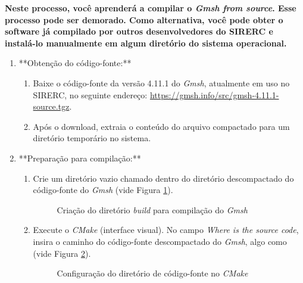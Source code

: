 \documentclass[a4paper,11pt]{article}
\newcommand{\sistema}{\textsf{SIRERC}}
\newcommand{\cmake}{\textit{CMake}}
\newcommand{\build}{\textit{build}}
\newcommand{\gmsh}{\textit{Gmsh}}
\newcommand{\cautionbox}[1]{
	\vskip 5mm
	\begin{leftbar}
		\textbf{#1}
	\end{leftbar}
	\vskip 5mm
}
\begin{document}
\cautionbox{
	Neste processo, você aprenderá a compilar o \gmsh{} \emph{from source}. Esse processo pode ser demorado. Como alternativa, você pode obter o software já compilado por outros desenvolvedores do \sistema{} e instalá-lo manualmente em algum diretório do sistema operacional.
}

\begin{enumerate}
	\item **Obtenção do código-fonte:**
	\begin{enumerate}
		\item Baixe o código-fonte da versão 4.11.1 do \gmsh{}, atualmente em uso no \sistema{}, no seguinte endereço: \url{https://gmsh.info/src/gmsh-4.11.1-source.tgz}.
		\item Após o download, extraia o conteúdo do arquivo compactado para um diretório temporário no sistema.
	\end{enumerate}
	
	\item **Preparação para compilação:**
	\begin{enumerate}
		\item Crie um diretório vazio chamado  dentro do diretório descompactado do código-fonte do \gmsh{} (vide Figura \ref{fig:gmshbuilddir}).
		
		\begin{figure}[H]\centering
			\caption{Criação do diretório \build{} para compilação do \gmsh{}}\label{fig:gmshbuilddir}
		\end{figure}
		
		\item Execute o \cmake{} (interface visual). No campo \emph{Where is the source code}, insira o caminho do código-fonte descompactado do \gmsh{}, algo como \path{C:\Users\username\Downloads\gmsh-4.11.1-source} (vide Figura \ref{fig:gmshbuildsrc}).
		
		\begin{figure}[H]\centering
			\caption{Configuração do diretório de código-fonte no \cmake{}}\label{fig:gmshbuildsrc}
		\end{figure}
		

\end{enumerate}
\end{enumerate}
\end{document}
